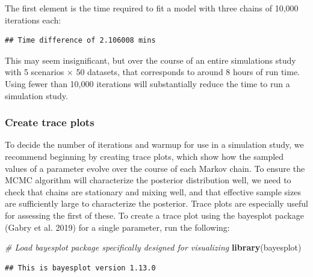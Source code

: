 \documentclass[
]{article}
\newenvironment{Shaded}{\begin{snugshade}}{\end{snugshade}}
\newcommand{\CommentTok}[1]{\textcolor[rgb]{0.56,0.35,0.01}{\textit{#1}}}
\newcommand{\FunctionTok}[1]{\textcolor[rgb]{0.13,0.29,0.53}{\textbf{#1}}}
\newcommand{\NormalTok}[1]{#1}
\newcommand{\SpecialCharTok}[1]{\textcolor[rgb]{0.81,0.36,0.00}{\textbf{#1}}}
\begin{document}
\linespread{1}

The first element is the time required to fit a model with three chains of 10,000 iterations each:

\linespread{1}

\begin{Shaded}
\end{Shaded}

\begin{verbatim}
## Time difference of 2.106008 mins
\end{verbatim}

\linespread{1}

This may seem insignificant, but over the course of an entire simulations study with 5 scenarios \(\times\) 50 datasets, that corresponds to around 8 hours of run time. Using fewer than 10,000 iterations will substantially reduce the time to run a simulation study.

\subsubsection{Create trace plots}\label{create-trace-plots}

To decide the number of iterations and warmup for use in a simulation study, we recommend beginning by creating trace plots, which show how the sampled values of a parameter evolve over the course of each Markov chain. To ensure the MCMC algorithm will characterize the posterior distribution well, we need to check that chains are stationary and mixing well, and that effective sample sizes are sufficiently large to characterize the posterior. Trace plots are especially useful for assessing the first of these. To create a trace plot using the bayesplot package (Gabry et al. 2019) for a single parameter, run the following:

\linespread{1}

\begin{Shaded}
\begin{Highlighting}[]
\CommentTok{\# Load bayesplot package specifically designed for visualizing }
\FunctionTok{library}\NormalTok{(bayesplot)}
\end{Highlighting}
\end{Shaded}

\begin{verbatim}
## This is bayesplot version 1.13.0
\end{verbatim}
\end{document}

